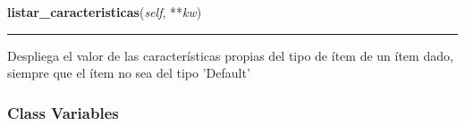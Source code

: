     \vspace{0.5ex}

\hspace{.8\funcindent}\begin{boxedminipage}{\funcwidth}

    \raggedright \textbf{listar\_caracteristicas}(\textit{self}, **\textit{kw})

    \vspace{-1.5ex}

    \rule{\textwidth}{0.5\fboxrule}
\setlength{\parskip}{2ex}
    Despliega el valor de las características propias del tipo de ítem de 
    un ítem dado, siempre que el ítem no sea del tipo 'Default'

\setlength{\parskip}{1ex}
    \end{boxedminipage}



  \subsubsection{Class Variables}

